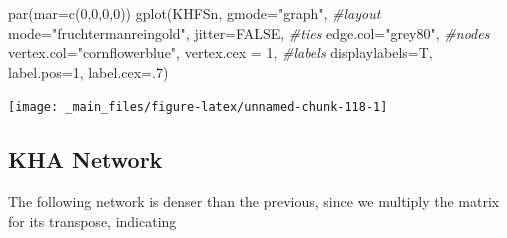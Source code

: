 \documentclass[
  notitlepage,
  onecolumn,
  openany]{book}
\newenvironment{Shaded}{\begin{snugshade}}{\end{snugshade}}
\newcommand{\AttributeTok}[1]{\textcolor[rgb]{0.77,0.63,0.00}{#1}}
\newcommand{\CommentTok}[1]{\textcolor[rgb]{0.56,0.35,0.01}{\textit{#1}}}
\newcommand{\ConstantTok}[1]{\textcolor[rgb]{0.00,0.00,0.00}{#1}}
\newcommand{\DecValTok}[1]{\textcolor[rgb]{0.00,0.00,0.81}{#1}}
\newcommand{\FunctionTok}[1]{\textcolor[rgb]{0.00,0.00,0.00}{#1}}
\newcommand{\NormalTok}[1]{#1}
\newcommand{\StringTok}[1]{\textcolor[rgb]{0.31,0.60,0.02}{#1}}
\begin{document}
\begin{Shaded}
\begin{Highlighting}[]
\FunctionTok{par}\NormalTok{(}\AttributeTok{mar=}\FunctionTok{c}\NormalTok{(}\DecValTok{0}\NormalTok{,}\DecValTok{0}\NormalTok{,}\DecValTok{0}\NormalTok{,}\DecValTok{0}\NormalTok{))}
\FunctionTok{gplot}\NormalTok{(KHFSn, }
      \AttributeTok{gmode=}\StringTok{"graph"}\NormalTok{,}
      \CommentTok{\#layout}
      \AttributeTok{mode=}\StringTok{"fruchtermanreingold"}\NormalTok{,}
      \AttributeTok{jitter=}\ConstantTok{FALSE}\NormalTok{,}
      \CommentTok{\#ties}
      \AttributeTok{edge.col=}\StringTok{"grey80"}\NormalTok{,}
      \CommentTok{\#nodes}
      \AttributeTok{vertex.col=}\StringTok{"cornflowerblue"}\NormalTok{,}
      \AttributeTok{vertex.cex =} \DecValTok{1}\NormalTok{,}
      \CommentTok{\#labels}
      \AttributeTok{displaylabels=}\NormalTok{T,}
      \AttributeTok{label.pos=}\DecValTok{1}\NormalTok{,}
      \AttributeTok{label.cex=}\NormalTok{.}\DecValTok{7}\NormalTok{)}
\end{Highlighting}
\end{Shaded}

\begin{center}\texttt{[image: \_main\_files/figure-latex/unnamed-chunk-118-1]} \end{center}

\hypertarget{kha-network}{%
\subsection{KHA Network}\label{kha-network}}

The following network is denser than the previous, since we multiply the matrix for its transpose, indicating
\end{document}
